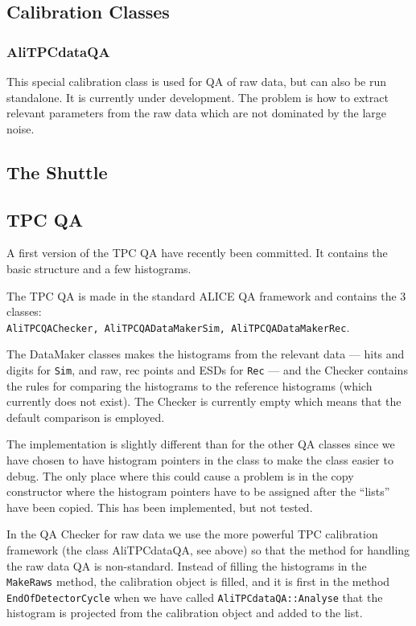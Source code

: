 \documentclass[a4paper,12pt]{article}
\begin{document}
\subsection{Calibration Classes}


\subsubsection{AliTPCdataQA}

This special calibration class is used for QA of raw data, but can
also be run standalone. It is currently under development. The problem
is how to extract relevant parameters from the raw data which are not
dominated by the large noise.

\subsection{The Shuttle}


\subsection{TPC QA}

A first version of the TPC QA have recently been committed. It
contains the basic structure and a few histograms.

The TPC QA is made in the standard ALICE QA framework and contains the
3 classes:\\
\texttt{AliTPCQAChecker, AliTPCQADataMakerSim,
AliTPCQADataMakerRec}.

The DataMaker classes makes the histograms from the relevant data ---
hits and digits for \texttt{Sim}, and raw, rec points and ESDs for
\texttt{Rec} --- and the Checker contains the rules for comparing the
histograms to the reference histograms (which currently does not
exist). The Checker is currently empty which means that the default
comparison is employed.

The implementation is slightly different than for the other QA classes
since we have chosen to have histogram pointers in the class to make
the class easier to debug. The only place where this could cause
a problem is in the copy constructor where the histogram pointers have
to be assigned after the ``lists'' have been copied. This has been
implemented, but not tested.

In the QA Checker for raw data we use the more powerful TPC
calibration framework (the class AliTPCdataQA, see above) so that the
method for handling the raw data QA is non-standard. Instead of
filling the histograms in the \texttt{MakeRaws} method, the
calibration object is filled, and it is first in the method
\texttt{EndOfDetectorCycle} when we have called
\texttt{AliTPCdataQA::Analyse} that the histogram is projected from
the calibration object and added to the list.
\end{document}
